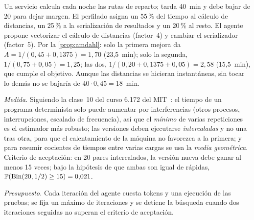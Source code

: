\begin{ejemplo}\label{ej:caso-codigo}
Un servicio calcula cada noche las rutas de reparto; tarda 40~min y debe bajar de 20 para dejar margen. El perfilado asigna un 55\,\% del tiempo al cálculo de distancias, un 25\,\% a la serialización de resultados y un 20\,\% al resto. El agente propone vectorizar el cálculo de distancias (factor~4) y cambiar el serializador (factor~5). Por la \cref{prop:amdahl}: solo la primera mejora da $A=1/(0{,}45+0{,}1375)=1{,}70$ (23{,}5~min); solo la segunda, $1/(0{,}75+0{,}05)=1{,}25$; las dos, $1/(0{,}20+0{,}1375+0{,}05)=2{,}58$ (15{,}5~min), que cumple el objetivo. Aunque las distancias se hicieran instantáneas, sin tocar lo demás no se bajaría de $40\cdot0{,}45=18$~min.

\emph{Medida.} Siguiendo la clase~10 del curso 6.172 del MIT~\cite{mit6172}: el tiempo de un programa determinista solo puede aumentar por interferencias (otros procesos, interrupciones, escalado de frecuencia), así que el \emph{mínimo} de varias repeticiones es el estimador más robusto; las versiones deben ejecutarse \emph{intercaladas} y no una tras otra, para que el calentamiento de la máquina no favorezca a la primera; y para resumir cocientes de tiempos entre varias cargas se usa la \emph{media geométrica}. Criterio de aceptación: en 20 pares intercalados, la versión nueva debe ganar al menos 15 veces; bajo la hipótesis de que ambas son igual de rápidas, $\mathbb{P}(\text{Bin}(20,1/2)\ge15)=0{,}021$.

\emph{Presupuesto.} Cada iteración del agente cuesta tokens y una ejecución de las pruebas; se fija un máximo de iteraciones y se detiene la búsqueda cuando dos iteraciones seguidas no superan el criterio de aceptación.
\end{ejemplo}

